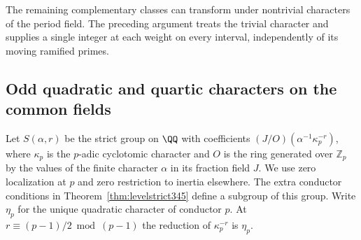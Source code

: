 \documentclass[a4paper,11pt]{article}
\theoremstyle{definition}
\theoremstyle{remark}
\newcommand{\ZZ}{\mathbb Z}\newcommand{\ord}{\operatorname{ord}}
\numberwithin{equation}{section}
\begin{document}
The remaining complementary classes can transform under nontrivial
characters of the period field. The preceding argument treats the
trivial character and supplies a single integer at each weight on
every interval, independently of its moving ramified primes.


\subsection{Odd quadratic and quartic characters on the common fields}
\label{sec:oddquartic539}

Let \(S(\alpha,r)\) be the strict group on \(\QQ\) with coefficients
\((J/O)(\alpha^{-1}\kappa_p^{-r})\), where \(\kappa_p\) is the
\(p\)-adic cyclotomic character and \(O\) is the ring generated
over \(\ZZ_p\) by the values of the finite character \(\alpha\)
in its fraction field \(J\). We use zero localization at \(p\)
and zero restriction to inertia elsewhere. The extra conductor
conditions in Theorem~\ref{thm:levelstrict345} define a subgroup
of this group. Write \(\eta_p\) for the unique quadratic character
of conductor \(p\). At \(r\equiv(p-1)/2\bmod(p-1)\) the reduction
of \(\kappa_p^{-r}\) is \(\eta_p\).
\end{document}
